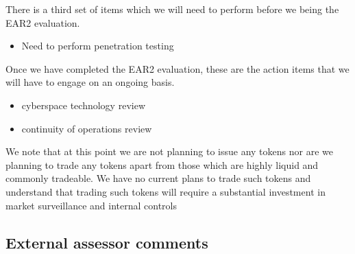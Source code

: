 \documentclass[]{report}
\begin{document}
There is a third set of items which we will need to perform
before we being the EAR2 evaluation.

\begin{itemize}
\item Need to perform penetration testing
\end{itemize}

Once we have completed the EAR2 evaluation, these are the action items
that we will have to engage on an ongoing basis.

\begin{itemize}
\item cyberspace technology review
\item continuity of operations review
\end{itemize}

We note that at this point we are not planning to issue any tokens nor
are we planning to trade any tokens apart from those which are highly
liquid and commonly tradeable.  We have no current plans to trade such
tokens and understand that trading such tokens will require a
substantial investment in market surveillance and internal controls

\subsection{External assessor comments}
\end{document}
